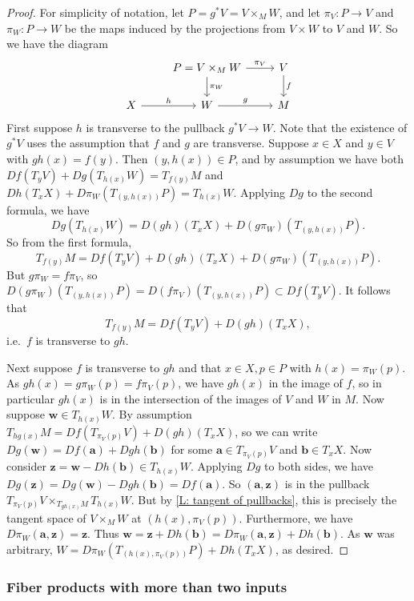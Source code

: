 \begin{proof}
	For simplicity of notation, let $P = g^*V = V \times _MW$, and let $\pi_V \colon P \to V$ and $\pi_W \colon P \to W$ be the maps induced by the projections from $V \times W$ to $V$ and $W$.
	So we have the diagram
	\[
	\begin{tikzcd}
		& P = V \times_M W \arrow[r, "\pi_V"] \arrow[d, "\pi_W"] & V \arrow[d, "f"] \\
		X \arrow[r, "h"] & W \arrow[r, "g"]&  M
	\end{tikzcd}
	\]
	First suppose $h$ is transverse to the pullback $g^*V \to W$.
	Note that the existence of $g^*V$ uses the assumption that $f$ and $g$ are transverse.
	Suppose $x \in X$ and $y \in V$ with $gh(x) = f(y)$.
	Then $(y,h(x)) \in P$, and by assumption we have both $Df(T_yV)+Dg(T_{h(x)}W) = T_{f(y)}M$ and
	$Dh(T_xX)+D\pi_W(T_{(y,h(x))}P) = T_{h(x)}W$.
	Applying $Dg$ to the second formula, we have
	$$Dg(T_{h(x)}W) = D(gh)(T_xX)+D(g\pi_W)(T_{(y,h(x))}P).$$
	So from the first formula,
	$$T_{f(y)}M = Df(T_yV)+D(gh)(T_xX)+D(g\pi_W)(T_{(y,h(x))}P).$$
	But $g\pi_W = f\pi_V$, so $D(g\pi_W)(T_{(y,h(x))}P) = D(f\pi_V)(T_{(y,h(x))}P) \subset Df(T_yV)$.
	It follows that
	$$T_{f(y)}M = Df(T_yV)+D(gh)(T_xX),$$
	i.e.\ $f$ is transverse to $gh$.

	Next suppose $f$ is transverse to $gh$ and that $x \in X, p \in P$ with $h(x) = \pi_W(p)$.
	As $gh(x) = g\pi_W(p) = f\pi_V(p)$, we have $gh(x)$ in the image of $f$, so in particular $gh(x)$ is in the intersection of the images of $V$ and $W$ in $M$.
	Now suppose $\mathbf w \in T_{h(x)}W$.
	By assumption $T_{hg(x)}M = Df(T_{\pi_V(p)}V)+D(gh)(T_xX)$, so we can write $Dg(\mathbf w) = Df(\mathbf a)+Dgh(\mathbf b)$ for some $\mathbf a \in T_{\pi_V(p)}V$ and $\mathbf b \in T_x X$.
	Now consider $\mathbf z = \mathbf w-Dh(\mathbf b) \in T_{h(x)}W$.
	Applying $Dg$ to both sides, we have $Dg(\mathbf z) = Dg(\mathbf w)-Dgh(\mathbf b) = Df(\mathbf a)$.
	So $(\mathbf a,\mathbf z)$ is in the pullback $T_{\pi_V(p)}V \times _{T_{gh(x)}M} T_{h(x)}W$.
	But by \cref{L: tangent of pullbacks}, this is precisely the tangent space of $V \times _MW$ at $(h(x),\pi_V(p))$.
	Furthermore, we have $D\pi_W(\mathbf a,\mathbf z) = \mathbf z$.
	Thus $\mathbf w = \mathbf z+Dh(\mathbf b) = D\pi_W(\mathbf a,\mathbf z)+Dh(\mathbf b)$.
	As $\mathbf w$ was arbitrary, $W = D\pi_W(T_{(h(x),\pi_V(p))}P)+Dh(T_xX)$, as desired.
\end{proof}

\subsubsection{Fiber products with more than two inputs}

